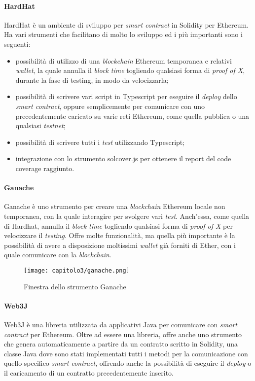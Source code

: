 \paragraph{HardHat}
HardHat è un ambiente di sviluppo per \textit{smart contract} in Solidity per Ethereum. Ha vari strumenti che facilitano di molto lo sviluppo ed i più importanti sono i seguenti:
\begin{itemize}
  \item possibilità di utilizzo di una \textit{blockchain} Ethereum temporanea e relativi \textit{wallet}, la quale annulla il \textit{block time} togliendo qualsiasi forma di \textit{proof of X}, durante la fase di testing, in modo da velocizzarla;
  \item possibilità di scrivere vari script in Typescript per eseguire il \textit{deploy} dello \textit{smart contract}, oppure semplicemente per comunicare con uno precedentemente caricato su varie reti Ethereum, come quella pubblica o una qualsiasi \textit{testnet};
  \item possibilità di scrivere tutti i \textit{test} utilizzando Typescript;
  \item integrazione con lo strumento solcover.js per ottenere il report del code coverage raggiunto.
\end{itemize}

\paragraph{Ganache}
Ganache è uno strumento per creare una \textit{blockchain} Ethereum locale non temporanea, con la quale interagire per svolgere vari \textit{test}. Anch'essa, come quella di Hardhat, annulla il \textit{block time} togliendo qualsiasi forma di \textit{proof of X} per velocizzare il \textit{testing}. Offre molte funzionalità, ma quella più importante è la possibilità di avere a disposizione moltissimi \textit{wallet} già forniti di Ether, con i quale comunicare con la \textit{blockchain}.

\begin{figure}[h!]
  \centering
  \texttt{[image: capitolo3/ganache.png]}
  \caption{Finestra dello strumento Ganache}
\end{figure}

\paragraph{Web3J} 
Web3J è una libreria utilizzata da applicativi Java per comunicare con \textit{smart contract} per Ethereum.
Oltre ad essere una libreria, offre anche uno strumento che genera automaticamente a partire da un contratto scritto in Solidity, una classe Java dove sono stati implementati tutti i metodi per la comunicazione con quello specifico \textit{smart contract}, offrendo anche la possibilità di eseguire il \textit{deploy} o il caricamento di un contratto precedentemente inserito. 

